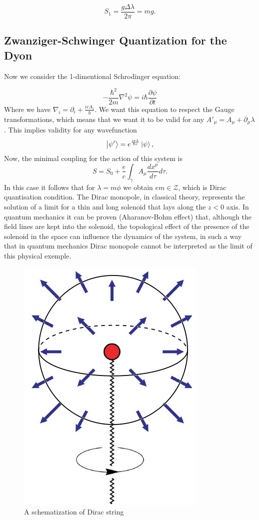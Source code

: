 \begin{equation}
S_1=\frac{g\Delta\lambda}{2\pi}=mg.
\end{equation}
\subsection{Zwanziger-Schwinger Quantization for the Dyon}

Now we consider the 1-dimentional Schrodinger equation:

\begin{equation}
    -\frac{\hbar^2}{2m}\nabla^2\psi=i\hbar\frac{\partial\psi}{\partial t}
\end{equation}
Where we have $\nabla_i=\partial_i+\frac{ie A_i}{h}$. We want this equation to respect the Gauge transformations, which means that we want it to be valid for any $A'_{\mu}=A_{\mu}+\partial_{\mu}\lambda$. This implies validity for any wavefunction
\begin{equation}
\ket{\psi'}=e^{\frac{ie\lambda}{\hbar c}}\ket{\psi},
\end{equation}
Now, the minimal coupling for the action of this system is
\begin{equation}
S=S_0+\frac{e}{c}\int_{\gamma}A_{\mu}\frac{dx^{\mu}}{d\tau}d\tau.
\end{equation}
In this case it follows
that for $\lambda=m\phi$ we obtain $em\in \mathcal{Z}$, which is Dirac quantisation condition. The Dirac monopole, in classical theory, represents the solution of a limit for a thin and long solenoid that lays along the $z<0$ axis. In quantum mechanics it can be proven (Aharanov-Bohm effect) that, although the field lines are kept into the solenoid, the topological effect of the presence of the solenoid in the space can influence the dynamics of the system, in such a way that in quantum mechanics Dirac monopole cannot be interpreted as the limit of this physical exemple.
\begin{figure}[h]
\centering
\includegraphics[scale=0.3]{DiracMon.png}
\caption{A schematization of Dirac string}
\label{fig-DirMon}
\end{figure}

